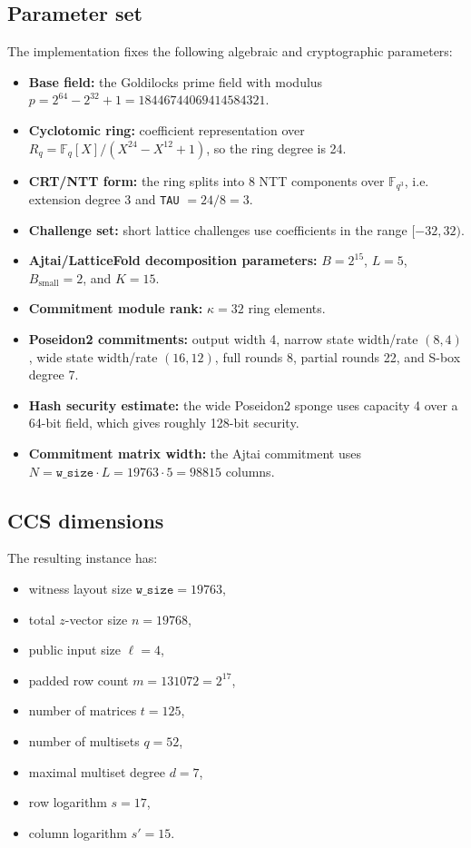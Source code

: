 \subsection{Parameter set}

The implementation fixes the following algebraic and cryptographic parameters:

\begin{itemize}
	\item \textbf{Base field:} the Goldilocks prime field with modulus
	      $p = 2^{64} - 2^{32} + 1 = 18446744069414584321$.
	\item \textbf{Cyclotomic ring:} coefficient representation over
	      $R_q = \mathbb{F}_q[X]/(X^{24} - X^{12} + 1)$, so the ring degree is 24.
	\item \textbf{CRT/NTT form:} the ring splits into 8 NTT components over
	      $\mathbb{F}_{q^3}$, i.e. extension degree 3 and \texttt{TAU} $= 24 / 8 = 3$.
	\item \textbf{Challenge set:} short lattice challenges use coefficients in the range $[-32, 32)$.
	\item \textbf{Ajtai/LatticeFold decomposition parameters:}
	      $B = 2^{15}$, $L = 5$, $B_{\text{small}} = 2$, and $K = 15$.
	\item \textbf{Commitment module rank:} $\kappa = 32$ ring elements.
	\item \textbf{Poseidon2 commitments:} output width 4, narrow state width/rate $(8, 4)$, wide state width/rate $(16, 12)$, full rounds 8, partial rounds 22, and S-box degree 7.
	\item \textbf{Hash security estimate:} the wide Poseidon2 sponge uses capacity 4 over a 64-bit field, which gives roughly 128-bit security.
	\item \textbf{Commitment matrix width:} the Ajtai commitment uses
	      $N = \texttt{w\_size} \cdot L = 19763 \cdot 5 = 98815$ columns.
\end{itemize}

\subsection{CCS dimensions}

The resulting instance has:

\begin{itemize}
	\item witness layout size $\texttt{w\_size} = 19763$,
	\item total $z$-vector size $n = 19768$,
	\item public input size $\ell = 4$,
	\item padded row count $m = 131072 = 2^{17}$,
	\item number of matrices $t = 125$,
	\item number of multisets $q = 52$,
	\item maximal multiset degree $d = 7$,
	\item row logarithm $s = 17$,
	\item column logarithm $s' = 15$.
\end{itemize}
